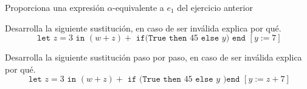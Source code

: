     \bigskip
    
    \begin{exercise}
        Proporciona una expresión $\alpha$-equivalente a $e_1$ del ejercicio anterior 
    \end{exercise}

    \bigskip
    
    
    \begin{exercise}
         Desarrolla la siguiente sustitución, en caso de ser inválida explica por qué.
         \[
         \texttt{ let } z = 3 \texttt{ in } (w + z) + \texttt{ if(} \texttt{True} \texttt{ then } 45 \texttt{ else } y \texttt{) } \texttt{end } [y:=7]
         \]
    \end{exercise}

    \bigskip
    
    \begin{exercise}
        Desarrolla la siguiente sustitución paso por paso, en caso de ser inválida explica por qué. 
        \[
            \texttt{ let } z = 3 \texttt{ in } (w + z) + \texttt{ if (} \texttt{True} \texttt{ then } 45 \texttt{ else } y \texttt{ )} \texttt{end } [y:=z+7]
        \]
    \end{exercise}

    \bigskip

